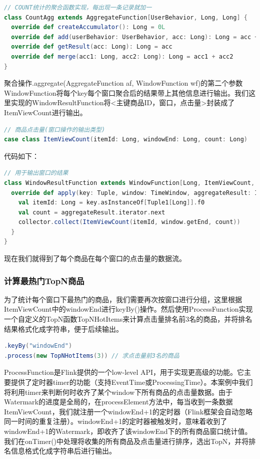 \documentclass[oneside]{ctexbook}
\begin{document}
\begin{lstlisting}[language=scala]
// COUNT统计的聚合函数实现，每出现一条记录就加一
class CountAgg extends AggregateFunction[UserBehavior, Long, Long] {
  override def createAccumulator(): Long = 0L
  override def add(userBehavior: UserBehavior, acc: Long): Long = acc + 1
  override def getResult(acc: Long): Long = acc
  override def merge(acc1: Long, acc2: Long): Long = acc1 + acc2
}
\end{lstlisting}

聚合操作.aggregate(AggregateFunction af, WindowFunction wf)的第二个参数WindowFunction将每个key每个窗口聚合后的结果带上其他信息进行输出。我们这里实现的WindowResultFunction将<主键商品ID，窗口，点击量>封装成了ItemViewCount进行输出。

\begin{lstlisting}[language=scala]
// 商品点击量(窗口操作的输出类型)
case class ItemViewCount(itemId: Long, windowEnd: Long, count: Long)
\end{lstlisting}

代码如下：

\begin{lstlisting}[language=scala]
// 用于输出窗口的结果
class WindowResultFunction extends WindowFunction[Long, ItemViewCount, Tuple, TimeWindow] {
  override def apply(key: Tuple, window: TimeWindow, aggregateResult: Iterable[Long], collector: Collector[ItemViewCount]) : Unit = {
    val itemId: Long = key.asInstanceOf[Tuple1[Long]].f0
    val count = aggregateResult.iterator.next
    collector.collect(ItemViewCount(itemId, window.getEnd, count))
  }
}
\end{lstlisting}

现在我们就得到了每个商品在每个窗口的点击量的数据流。

\subsubsection{计算最热门TopN商品}

为了统计每个窗口下最热门的商品，我们需要再次按窗口进行分组，这里根据ItemViewCount中的windowEnd进行keyBy()操作。然后使用ProcessFunction实现一个自定义的TopN函数TopNHotItems来计算点击量排名前3名的商品，并将排名结果格式化成字符串，便于后续输出。

\begin{lstlisting}[language=scala]
.keyBy("windowEnd")
.process(new TopNHotItems(3)) // 求点击量前3名的商品
\end{lstlisting}

ProcessFunction是Flink提供的一个low-level API，用于实现更高级的功能。它主要提供了定时器timer的功能（支持EventTime或ProcessingTime）。本案例中我们将利用timer来判断何时收齐了某个window下所有商品的点击量数据。由于Watermark的进度是全局的，在processElement方法中，每当收到一条数据ItemViewCount，我们就注册一个windowEnd+1的定时器（Flink框架会自动忽略同一时间的重复注册）。windowEnd+1的定时器被触发时，意味着收到了windowEnd+1的Watermark，即收齐了该windowEnd下的所有商品窗口统计值。我们在onTimer()中处理将收集的所有商品及点击量进行排序，选出TopN，并将排名信息格式化成字符串后进行输出。
\end{document}
